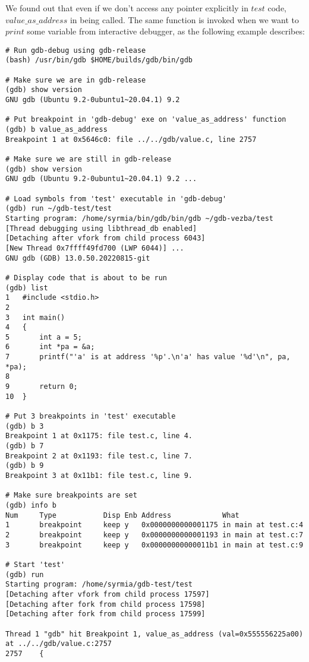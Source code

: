 \documentclass{report}
\begin{document}
 We found out that even if we don't access any pointer explicitly in $test$ code, $value\_as\_address$ in being called. The same function is invoked when we want to $print$ some variable from interactive debugger, as the following example describes:
\begin{verbatim}
# Run gdb-debug using gdb-release
(bash) /usr/bin/gdb $HOME/builds/gdb/bin/gdb

# Make sure we are in gdb-release     
(gdb) show version 
GNU gdb (Ubuntu 9.2-0ubuntu1~20.04.1) 9.2        

# Put breakpoint in 'gdb-debug' exe on 'value_as_address' function
(gdb) b value_as_address          
Breakpoint 1 at 0x5646c0: file ../../gdb/value.c, line 2757

# Make sure we are still in gdb-release
(gdb) show version  
GNU gdb (Ubuntu 9.2-0ubuntu1~20.04.1) 9.2 ...

# Load symbols from 'test' executable in 'gdb-debug'
(gdb) run ~/gdb-test/test               
Starting program: /home/syrmia/bin/gdb/bin/gdb ~/gdb-vezba/test
[Thread debugging using libthread_db enabled]
[Detaching after vfork from child process 6043]
[New Thread 0x7ffff49fd700 (LWP 6044)] ...
GNU gdb (GDB) 13.0.50.20220815-git

# Display code that is about to be run
(gdb) list                          
1	#include <stdio.h>
2	
3	int main()
4	{
5		int a = 5;
6		int *pa = &a;
7		printf("'a' is at address '%p'.\n'a' has value '%d'\n", pa, *pa);
8	
9		return 0;
10	}

# Put 3 breakpoints in 'test' executable
(gdb) b 3                                    
Breakpoint 1 at 0x1175: file test.c, line 4.
(gdb) b 7
Breakpoint 2 at 0x1193: file test.c, line 7.
(gdb) b 9
Breakpoint 3 at 0x11b1: file test.c, line 9.

# Make sure breakpoints are set
(gdb) info b                                
Num     Type           Disp Enb Address            What
1       breakpoint     keep y   0x0000000000001175 in main at test.c:4
2       breakpoint     keep y   0x0000000000001193 in main at test.c:7
3       breakpoint     keep y   0x00000000000011b1 in main at test.c:9

# Start 'test'
(gdb) run                                  
Starting program: /home/syrmia/gdb-test/test 
[Detaching after vfork from child process 17597]
[Detaching after fork from child process 17598]
[Detaching after fork from child process 17599]

Thread 1 "gdb" hit Breakpoint 1, value_as_address (val=0x555556225a00) 
at ../../gdb/value.c:2757
2757	{


\end{verbatim}
\end{document}
